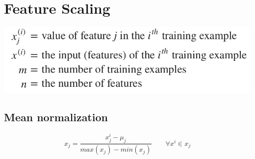 
\newpage
\section{Feature Scaling}

\includegraphics[scale=0.5]{figures/feature_notation}

\subsection{Mean normalization}

$$ x_{j} = \frac{x_{j}^{i} - \mu_{j}}{max(x_{j}) - min(x_{j})} \qquad\forall x^{i} \in x_{j}$$


